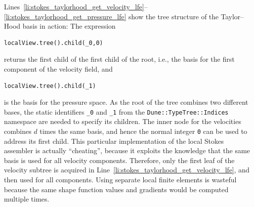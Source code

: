 \documentclass[a4paper,10pt,headings=normal,bibliography=totoc]{scrartcl}
\newcommand{\cpp}[1]{\lstinline[basicstyle=\ttfamily]!#1!}
\begin{document}
Lines~\ref{li:stokes_taylorhood_get_velocity_lfe}--\ref{li:stokes_taylorhood_get_pressure_lfe}
show the tree structure of the Taylor--Hood basis in action:
The expression
\begin{lstlisting}[style=Example]
localView.tree().child(_0,0)
\end{lstlisting}
returns the first child of the first child of the root, i.e., the basis for the first component of the velocity field,
and
\begin{lstlisting}[style=Example]
localView.tree().child(_1)
\end{lstlisting}
is the basis for the pressure space.
As the root of the tree combines two different bases, the static identifiers \cpp{_0} and \cpp{_1}
from the \cpp{Dune::TypeTree::Indices} namespace are needed to specify its children.  The inner node for the velocities
combines $d$ times the same basis, and hence the normal integer \cpp{0} can be used to address its first child.
This particular implementation of the local Stokes assembler is actually ``cheating'', because it exploits the knowledge
that the same basis is used for all velocity components.  Therefore, only the first leaf of the velocity
subtree is acquired in Line~\ref{li:stokes_taylorhood_get_velocity_lfe}, and then used for all components.
Using separate local finite elements is wasteful because the same shape function values and gradients
would be computed multiple times.
\end{document}
